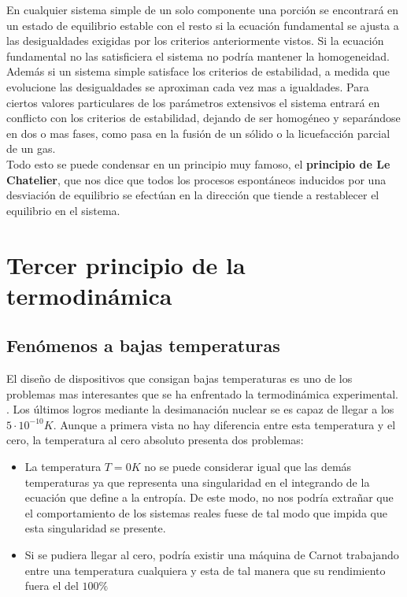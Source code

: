 \documentclass[12pt,a4paper]{article}
\begin{document}
En cualquier sistema simple de un solo componente una porción se encontrará en un estado de equilibrio estable con el resto si la ecuación fundamental se ajusta a las desigualdades exigidas por los criterios anteriormente vistos. Si la ecuación fundamental no las satisficiera el sistema no podría mantener la homogeneidad. \\

Además si un sistema simple satisface los criterios de estabilidad, a medida que evolucione las desigualdades se aproximan cada vez mas a igualdades. Para ciertos valores particulares de los parámetros extensivos el sistema entrará en conflicto con los criterios de estabilidad, dejando de ser homogéneo y separándose en dos o mas fases, como pasa en la fusión de un sólido o la licuefacción parcial de un gas. \\

Todo esto se puede condensar en un principio muy famoso, el \textbf{principio de Le Chatelier}, que nos dice que todos los procesos espontáneos inducidos por una desviación de equilibrio se efectúan en la dirección que tiende a restablecer el equilibrio en el sistema. 


\newpage

\section{Tercer principio de la termodinámica}

\subsection{Fenómenos a bajas temperaturas}

El diseño de dispositivos que consigan bajas temperaturas es uno de los problemas mas interesantes que se ha enfrentado la termodinámica experimental. . Los últimos logros mediante la desimanación nuclear se es capaz de llegar a los $5 \cdot 10^{-10} K$. Aunque a primera vista no hay diferencia entre esta temperatura y el cero, la temperatura al cero absoluto presenta dos problemas:

\begin{itemize}
\item La temperatura $T=0K$ no se puede considerar igual que las demás temperaturas ya que representa una singularidad en el integrando de la ecuación que define a la entropía. De este modo, no nos podría extrañar que el comportamiento de los sistemas reales fuese de tal modo que impida que esta singularidad se presente.

\item Si se pudiera llegar al cero, podría existir una máquina de Carnot trabajando entre una temperatura cualquiera y esta de tal manera que su rendimiento fuera el del $100\%$
\end{itemize}
\end{document}
